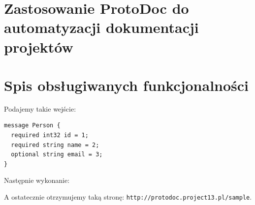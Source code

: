 \documentclass[pdflatex,11pt]{aghdpl}
\begin{document}
\chapter{Zastosowanie ProtoDoc do automatyzacji dokumentacji projektów}

\chapter{Spis obsługiwanych funkcjonalności}
Podajemy takie wejście:
\begin{verbatim}
message Person {
  required int32 id = 1;
  required string name = 2;
  optional string email = 3;
}
\end{verbatim}

Następnie wykonanie:

A ostatecznie otrzymujemy taką stronę: \verb|http://protodoc.project13.pl/sample|.




\appendix





\end{document}
